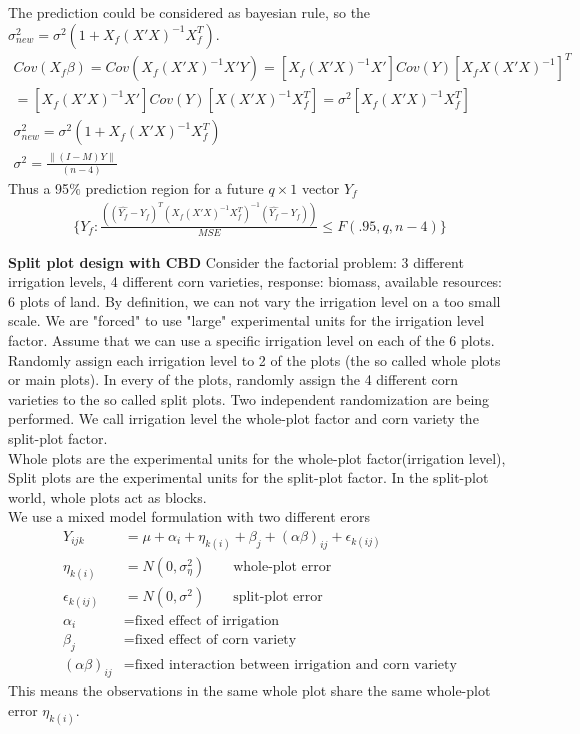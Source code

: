 \documentclass{homework}
\begin{document}
\begin{itemize}
    The prediction could be considered as bayesian rule, so the $\sigma_{new}^2 = \sigma^2 (1+ X_f(X'X)^{-1}X_f^T)$.\\
     \[ 
    \begin{split}
    Cov(X_f \beta) = Cov(X_f (X'X)^{-1}X'Y) = [X_f (X'X)^{-1}X'] Cov(Y) [X_f X(X'X)^{-1}]^T\\
    = [X_f (X'X)^{-1}X'] Cov(Y) [X(X'X)^{-1} X_f^{T}] = \sigma^2[X_f (X'X)^{-1} X_f^T]\\
    \sigma_{new}^2 = \sigma^2 (1+ X_f(X'X)^{-1}X_f^T)\\
    \sigma^2 = \frac{\lVert (I-M)Y \rVert}{(n-4)}
    \end{split}
    \]     
    Thus a 95$\%$ prediction region for a future  $q \times 1$ vector $Y_f$\\
     \[ 
    \begin{split}
    \{ Y_f: \frac{((\hat{Y_f}-Y_f)^T (X_f (X'X)^{-1} X_f^T)^{-1} (\hat{Y_f}-Y_f))}{MSE} \leq F(.95, q, n-4) \}
    \end{split}
    \]     
\end{itemize}



\exercise
\textbf{Split plot design with CBD} Consider the factorial problem: 3 different irrigation levels, 4 different corn varieties, response: biomass, available resources: 6 plots of land. By definition, we can not vary the irrigation level on a too small scale. We are "forced" to use "large" experimental units for the irrigation level factor. Assume that we can use a specific irrigation level on each of the 6 plots.\\
Randomly assign each irrigation level to 2 of the plots (the so called whole plots or main plots). In every of the plots, randomly assign the 4 different corn varieties to the so called split plots. Two independent randomization are being performed. We call irrigation level the whole-plot factor and corn variety the split-plot factor.\\
Whole plots are the experimental units for the whole-plot factor(irrigation level), Split plots are the experimental units for the split-plot factor. In the split-plot world, whole plots act as blocks. \\
We use a mixed model formulation with two different erors\\
\begin{align*}
Y_{ijk} &= \mu + \alpha_i + \eta_{k(i)} + \beta_j + (\alpha\beta)_{ij} + \epsilon_{k(ij)}\\
\eta_{k(i)} &= N(0, \sigma_{\eta}^2) \qquad \text{whole-plot error} \\
\epsilon_{k(ij)} &= N(0, \sigma^2) \qquad \text{split-plot error} \\
\alpha_i &= \text{fixed effect of irrigation}\\
\beta_j &= \text{fixed effect of corn variety}\\
(\alpha\beta)_{ij} &= \text{fixed interaction between irrigation and corn variety}
\end{align*} 
This means the observations in the same whole plot share the same whole-plot error $\eta_{k(i)}$.\\
\end{document}
